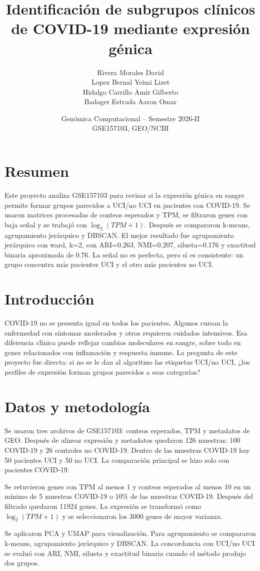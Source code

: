 \documentclass[11pt]{article}
\title{Identificación de subgrupos clínicos de COVID-19 mediante expresión génica}
\author{Rivera Morales David \\ Lopez Bernal Yeimi Lizet \\ Hidalgo Carrillo Amir Gilberto \\ Badager Estrada Aaron Omar}
\date{Genómica Computacional -- Semestre 2026-II\\GSE157103, GEO/NCBI}
\begin{document}
\maketitle

\section*{Resumen}
Este proyecto analiza GSE157103 para revisar si la expresión génica en sangre
permite formar grupos parecidos a UCI/no UCI en pacientes con COVID-19. Se
usaron matrices procesadas de conteos esperados y TPM, se filtraron genes con
baja señal y se trabajó con $\log_2(TPM + 1)$. Después se compararon k-means,
agrupamiento jerárquico y DBSCAN. El mejor resultado fue agrupamiento
jerárquico con ward, k=2, con
ARI=0.263, NMI=0.207,
silueta=0.176 y exactitud binaria aproximada de
0.76. La señal no es perfecta, pero sí es consistente:
un grupo concentra más pacientes UCI y el otro más pacientes no UCI.

\section{Introducción}
COVID-19 no se presenta igual en todos los pacientes. Algunos cursan la
enfermedad con síntomas moderados y otros requieren cuidados intensivos. Esa
diferencia clínica puede reflejar cambios moleculares en sangre, sobre todo en
genes relacionados con inflamación y respuesta inmune. La pregunta de este
proyecto fue directa: si no se le dan al algoritmo las etiquetas UCI/no UCI, ¿los
perfiles de expresión forman grupos parecidos a esas categorías?

\section{Datos y metodología}
Se usaron tres archivos de GSE157103: conteos esperados, TPM y metadatos de GEO.
Después de alinear expresión y metadatos quedaron 126 muestras:
100 COVID-19 y 26 controles no COVID-19. Dentro de las
muestras COVID-19 hay 50 pacientes UCI y
50 no UCI. La comparación principal se hizo
solo con pacientes COVID-19.

Se retuvieron genes con TPM al menos 1 y conteos esperados al menos 10 en un
mínimo de 5 muestras COVID-19 o 10\% de las muestras COVID-19. Después del
filtrado quedaron 11924 genes. La expresión se transformó
como $\log_2(TPM + 1)$ y se seleccionaron los 3000 genes de
mayor varianza.

Se aplicaron PCA y UMAP para visualización. Para agrupamiento se compararon
k-means, agrupamiento jerárquico y DBSCAN. La concordancia con UCI/no UCI se
evaluó con ARI, NMI, silueta y exactitud binaria cuando el método produjo dos
grupos.
\end{document}

